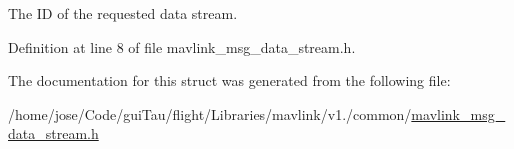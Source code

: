 The I\-D of the requested data stream. 



Definition at line 8 of file mavlink\-\_\-msg\-\_\-data\-\_\-stream.\-h.



The documentation for this struct was generated from the following file\-:\begin{DoxyCompactItemize}
\item 
/home/jose/\-Code/gui\-Tau/flight/\-Libraries/mavlink/v1./common/\hyperlink{mavlink__msg__data__stream_8h}{mavlink\-\_\-msg\-\_\-data\-\_\-stream.\-h}\end{DoxyCompactItemize}
